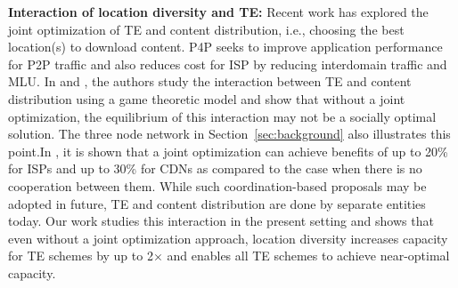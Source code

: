 \noindent\textbf{Interaction of location diversity and TE:}
Recent work has explored the joint optimization of TE and content distribution, i.e., choosing the best location(s) to download content. 
P4P \cite{P4P}  seeks to improve application performance for P2P traffic and also reduces cost for ISP by reducing interdomain traffic and MLU. In \cite{Jiang2009} and  \cite{JohariGameTheory}, the authors study the interaction between TE and content distribution using a game theoretic model and show that without a joint optimization, the equilibrium of this interaction may not be a socially optimal solution. The three node network in  Section~\ref{sec:background} also illustrates this point.In  \cite{Jiang2009}, it is shown that a joint optimization can achieve benefits of up to 20\% for ISPs and up to 30\% for CDNs as compared to the case when there is no cooperation between them. 
While such coordination-based proposals may be adopted in future, TE and content distribution are done by separate entities today. Our work studies this interaction in the present setting and shows that even without a joint optimization approach, location diversity increases  capacity for TE schemes by up to 2$\times$ and enables all TE schemes to achieve near-optimal capacity.




